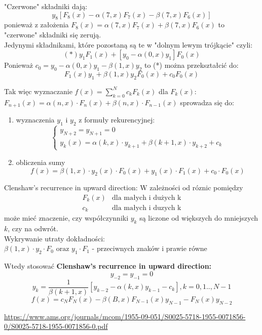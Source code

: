 \begin{frame}
"Czerwone" składniki dają:
$$y_8[F_8(x)-\alpha(7,x)F_7(x)-\beta(7,x)F_6(x)]$$
ponieważ z założenia $F_8(x)=\alpha(7,x)F_7(x)+\beta(7,x)F_6(x)$ to
"czerwone" składniki się zerują.\\
Jedynymi składnikami, które pozostaną są te w "dolnym lewym trójkącie" czyli:
$$(*)y_1F_1(x)+[y_0-\alpha(0,x)y_1]F_0(x)$$
Ponieważ $c_0=y_0-\alpha(0,x)y_1-\beta(1,x)y_2$ to
(*) można przekształcić do: 
	$$F_1(x)y_1+\beta(1,x)y_2F_0(x)+c_0F_0(x) $$
\end{frame}
\begin{frame}
    Tak więc wyznaczanie $f(x) = \sum_{k=0}^{N}c_kF_k(x)$ \newline
    dla $F_k(x)$: $F_{n+1}(x) = \alpha(n,x) \cdot F_n(x) + \beta(n,x) \cdot F_{n-1}(x)$ \newline
    sprowadza się do:
    \begin{enumerate}
    \item wyznaczenia $y_1$ i $y_2$ z formuły rekurencyjnej: \newline
    	$$\left\{\begin{array}{l}
    	y_{N+2} = y_{N+1} = 0 \\
        y_k(x) = \alpha(k,x) \cdot y_{k+1} + \beta(k+1,x) \cdot y_{k+2} +c_k
    	\end{array}\right.$$
     \item obliczenia sumy \newline
     $$f(x) = \beta(1,x) \cdot y_2(x) \cdot F_0(x) + y_1(x) \cdot F_1(x) + c_0 \cdot F_0(x)$$
    \end{enumerate}
\end{frame}
\begin{frame}{Clenshaw's recurrence in upward direction:}
    W zależności od róznic pomiędzy 
    $$\left.\begin{array}{cl}
    	F_k(x) & \text{dla małych i dużych k} \\
        c_k & \text{dla małych i duzych k}
    \end{array}$$
    może mieć znaczenie, czy 
    współczynniki $y_k$ są liczone  od większych do mniejszych $k$, czy na odwrót.\\ 
    Wykrywanie  utraty dokładności:\\
    $\beta(1,x) \cdot y_2 \cdot F_0 \text{ oraz } y_1 \cdot F_1$ - przeciwnych znaków i prawie równe
\end{frame}
\begin{frame}
	Wtedy stosować \textbf{Clenshaw's recurrence in upward direction:}
    $$y_{-2} = y_{-1} = 0$$
    $$y_k = \frac{1}{\beta(k+1,x)}[y_{k-2}-\alpha(k,x)y_{k-1} - c_k], k=0,1..,N-1$$
    $$f(x) = c_NF_N(x) - \beta(B,x)F_{N-1}(x)y_{N-1} - F_N(x)y_{N-2}$$
    
    \url{https://www.ams.org/journals/mcom/1955-09-051/S0025-5718-1955-0071856-0/S0025-5718-1955-0071856-0.pdf}
    
\end{frame}
